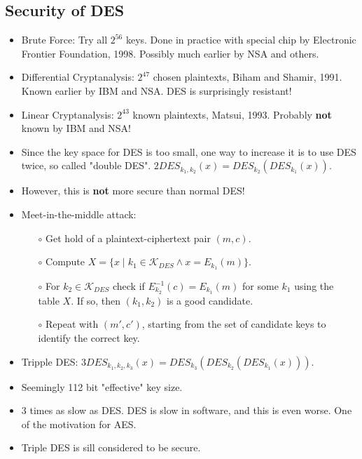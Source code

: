 \documentclass[a4paper]{scrartcl}
\begin{document}
\subsection*{Security of DES}
\begin{itemize}
\item Brute Force: Try all $2^56$ keys. Done in practice with special chip by Electronic Frontier Foundation, 1998. Possibly much earlier by NSA and others.
\item Differential Cryptanalysis: $2^{47}$ chosen plaintexts, Biham and Shamir, 1991. Known earlier by IBM and NSA. DES is surprisingly resistant!
\item Linear Cryptanalysis: $2^{43}$ known plaintexts, Matsui, 1993. Probably \textbf{not} known by IBM and NSA!
\item Since the key space for DES is too small, one way to increase it is to use DES twice, so called "double DES".
$2DES_{k_1,k_2}(x) = DES_{k_2}(DES_{k_1}(x))$.
\item However, this is \textbf{not} more secure than normal DES! 
\item Meet-in-the-middle attack:
\begin{itemize}
\item [$\circ$] Get hold of a plaintext-ciphertext pair $(m, c)$.
\item [$\circ$] Compute $X = \{x \mid k_1 \in \mathcal{K}_{DES} \land x = E_{k_1}(m) \}$.
\item [$\circ$] For $k_2 \in \mathcal{K}_{DES}$ check if $E_{k_2}^{-1}(c) = E_{k_1}(m)$ for some $k_1$ using the table $X$. If so, then $(k_1, k_2)$ is a good candidate.
\item [$\circ$] Repeat with $(m', c')$, starting from the set of candidate keys to identify the correct key.
\end{itemize}
\item Tripple DES: $3DES_{k_1,k_2,k_3}(x) = DES_{k_3}(DES_{k_2}(DES_{k_1}(x)))$.
\item Seemingly 112 bit "effective" key size.
\item 3 times as slow as DES. DES is slow in software, and this is even worse. One of the motivation for AES. 
\item Triple DES is sill considered to be secure.
\end{itemize}
\end{document}
